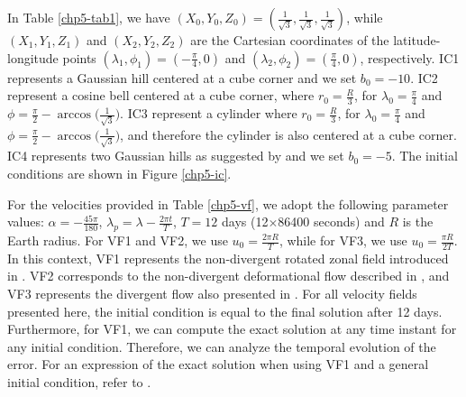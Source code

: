 In Table \ref{chp5-tab1}, we have $(X_0,Y_0,Z_0)=(\frac{1}{\sqrt{3}},\frac{1}{\sqrt{3}},\frac{1}{\sqrt{3}})$, while 
$(X_1,Y_1,Z_1)$ and $(X_2,Y_2,Z_2)$ are the Cartesian coordinates of the latitude-longitude points
$(\lambda_1,\phi_1) = (-\frac{\pi}{4},0)$ and
$(\lambda_2,\phi_2) = ( \frac{\pi}{4},0)$, respectively.
IC1 represents a Gaussian hill centered at a cube corner and we set $b_0 = -10$.
IC2 represent a cosine bell centered at a cube corner, where $r_0 = \frac{R}{3}$, 
for $\lambda_0=\frac{\pi}{4}$ and $\phi = \frac{\pi}{2}-\arccos{\big(\frac{1}{\sqrt{3}}\big)}$.
IC3 represent a cylinder where $r_0 = \frac{R}{3}$, 
for $\lambda_0=\frac{\pi}{4}$ and $\phi = \frac{\pi}{2}-\arccos{\big(\frac{1}{\sqrt{3}}\big)}$,
and therefore the cylinder is also centered at a cube corner.
IC4 represents two Gaussian hills as suggested by \citet{nair:2010} and we set $b_0 = -5$.
The initial conditions are shown in Figure \ref{chp5-ic}.

For the velocities provided in Table \ref{chp5-vf}, we adopt the following parameter values: 
$\alpha=-\frac{45\pi}{180}$, $\lambda_p=\lambda-\frac{2\pi t}{T}$, $T=12$ days (12$\times$86400 seconds) and $R$ is the Earth radius.
For VF1 and VF2, we use $u_0 = \frac{2\pi R}{T}$, while for VF3, we use $u_0 = \frac{\pi R}{2T}$.
In this context, VF1 represents the non-divergent rotated zonal field introduced in \citet{will:1992}.
VF2 corresponds to the non-divergent deformational flow described in \citet{nair:2010},
and VF3 represents the divergent flow also presented in \citet{nair:2010}.
For all velocity fields presented here, the initial condition is equal to the final solution after 12 days.
Furthermore, for VF1, we can compute the exact solution at any time instant for any initial condition.
Therefore, we can analyze the temporal evolution of the error.
For an expression of the exact solution when using VF1 and a general initial condition, refer to \citet[Theorem, p. 155]{brachet:2018}.

